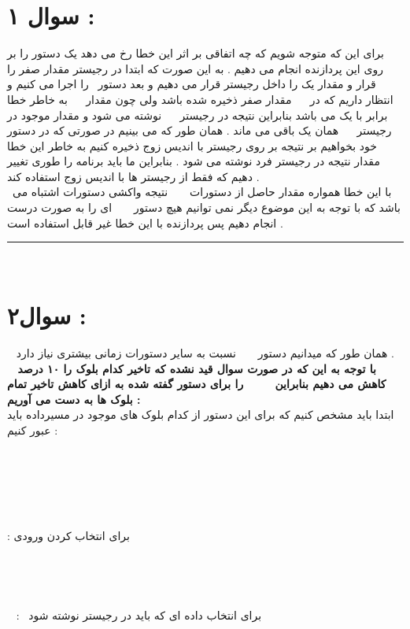


	\maketitle
	\section*{سوال ‍۱‍  : }
	
	برای این که متوجه شویم که چه اتفاقی بر اثر این خطا رخ می دهد یک دستور 
	را بر روی این پردازنده انجام می دهیم  . به این صورت که ابتدا در رجیستر 
	مقدار صفر را قرار و مقدار یک را داخل رجیستر 
	قرار می دهیم و بعد دستور 
	 را اجرا می کنیم و انتظار داریم که در 
	 مقدار صفر ذخیره شده باشد ولی چون مقدار 
	 به خاطر خطا برابر با یک می باشد بنابراین نتیجه در رجیستر 
	 نوشته می شود و مقدار موجود در رجیستر 
	 همان یک باقی می ماند . همان طور که می بینیم در صورتی که در دستور خود بخواهیم بر نتیجه بر روی رجیستر با اندیس زوج ذخیره کنیم به خاطر این خطا مقدار نتیجه در رجیستر فرد نوشته می شود . بنابراین ما باید برنامه را طوری تغییر دهیم که فقط از رجیستر ها با اندیس زوج استفاده کند . 
	 \\
	 با این خطا همواره مقدار حاصل از دستورات 
	  نتیجه واکشی دستورات اشتباه می باشد که با توجه به این موضوع دیگر نمی توانیم هیچ دستور
	  ای را به صورت درست انجام دهیم پس پردازنده با این خطا غیر قابل استفاده است . 
	  \hrule
	  \section*{سوال۲  : }
	  همان طور که میدانیم دستور
	  نسبت به سایر دستورات زمانی بیشتری نیاز دارد  . 
	  \\
	\textbf{  با توجه به این که در صورت سوال قید نشده که تاخیر کدام بلوک را ۱۰ درصد کاهش می دهیم بنابراین 
	   را برای دستور گفته  شده به ازای کاهش تاخیر تمام بلوک ها به دست می آوریم : }
   \\
 ابتدا باید مشخص کنیم که برای این دستور از کدام بلوک های موجود در مسیرداده باید عبور کنیم  : 
   
   
   \begin{flushright}
 	\item  {}
 \item	 {}
 \item 	{} : برای انتخاب کردن ورودی 
 \item	 {}
 \item		 {}
 \item 		  : 
 برای انتخاب داده ای که باید در رجیستر نوشته شود
   \end{flushright}

